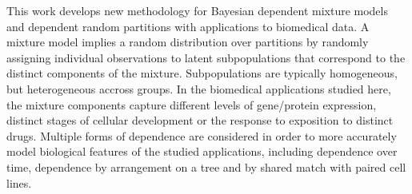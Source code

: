 \documentclass[12pt]{report}	%
\theoremstyle{definition}
\theoremstyle{remark}
\begin{document}
%
\utabstract
{}%
\indent

This work develops new methodology for Bayesian dependent mixture models and dependent random partitions with applications to biomedical data. A mixture model implies a random distribution over partitions by randomly assigning individual observations to latent subpopulations that correspond to the distinct components of the mixture. Subpopulations are typically homogeneous, but heterogeneous accross groups. In the biomedical applications studied here, the mixture components capture different levels of gene/protein expression, distinct stages of cellular development or the response to exposition to distinct drugs. Multiple forms of dependence are considered in order to more accurately model biological features of the studied applications, including dependence over time, dependence by arrangement on a tree and by shared match with paired cell lines.


\tableofcontents   %

\listoftables      %
\listoffigures     %



%
%









\end{document}
